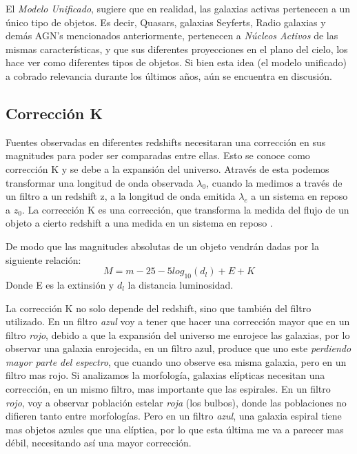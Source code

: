 \documentclass[a4paper,10pt]{article}
\begin{document}
El \textit{Modelo Unificado}, sugiere que en realidad, las galaxias activas pertenecen a un \'unico tipo de objetos. Es decir, Quasars, galaxias Seyferts, Radio galaxias y dem\'as AGN's mencionados anteriormente, pertenecen a \textit{N\'ucleos Activos} de las mismas caracter\'isticas, y que sus diferentes proyecciones en el plano del cielo, los hace ver como diferentes tipos de objetos. Si bien esta idea (el modelo unificado) a cobrado relevancia durante los \'ultimos a\~nos, a\'un se encuentra en discusi\'on.

    



\subsection{Correcci\'on K}
Fuentes observadas en diferentes redshifts necesitaran una correcci\'on en sus magnitudes para poder ser comparadas entre ellas. Esto se conoce como correcci\'on K y se debe a la expansi\'on del universo. Atrav\'es de esta podemos transformar una longitud de onda observada $\lambda_{0}$, cuando la medimos a trav\'es de un filtro a un redshift z, a la longitud de onda emitida $\lambda_{e}$ a un sistema en reposo a $z_{0}$. 
La correcci\'on K es una correcci\'on, que transforma la medida del flujo de un objeto a cierto redshift a una medida en un sistema en reposo \citep{Taverna}.

De modo que las magnitudes absolutas de un objeto vendr\'an dadas por la siguiente relaci\'on: 
\begin{equation}
M = m - 25 - 5log_{10}(d_{l}) + E + K 
\end{equation}
Donde E es la extinsi\'on y $d_{l}$ la distancia luminosidad.

La correcci\'on K no solo depende del redshift, sino que tambi\'en del filtro utilizado. En un filtro \textit{azul} voy a tener que hacer una correcci\'on mayor que en un filtro \textit{rojo}, debido a que la expansi\'on del universo me enrojece las galaxias, por lo observar una galaxia enrojecida, en un filtro azul, produce que uno este \textit{perdiendo mayor parte del espectro}, que cuando uno observe esa misma galaxia, pero en un filtro mas rojo. Si analizamos la morfolog\'ia, galaxias el\'ipticas necesitan una correcci\'on, en un mismo filtro, mas importante que las espirales. En un filtro \textit{rojo}, voy a observar poblaci\'on estelar \textit{roja} (los bulbos), donde las poblaciones no difieren tanto entre morfolog\'ias. Pero en un filtro \textit{azul}, una galaxia espiral tiene mas objetos azules que una el\'iptica, por lo que esta \'ultima me va a parecer mas d\'ebil, necesitando as\'i una mayor correcci\'on. 
\end{document}
